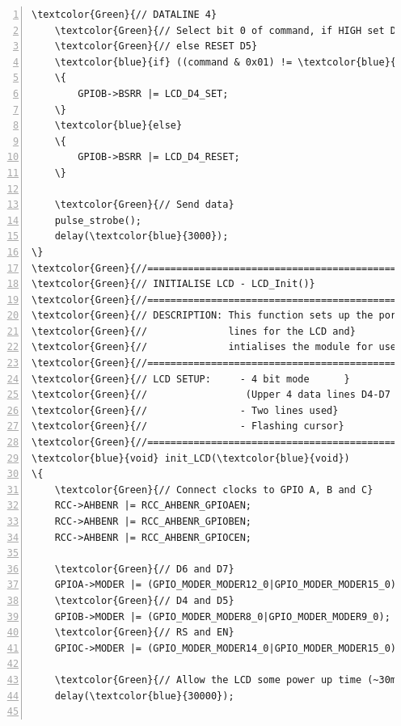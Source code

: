 \begin{Verbatim}[fontfamily=courier,fontsize=\small, numbers=left,commandchars=\\\{\}]
	\textcolor{Green}{// DATALINE 4}
	\textcolor{Green}{// Select bit 0 of command, if HIGH set Data line 5 (D5)}
	\textcolor{Green}{// else RESET D5}
	\textcolor{blue}{if} ((command & 0x01) != \textcolor{blue}{0})		       
	\{
		GPIOB->BSRR |= LCD_D4_SET;
	\}
	\textcolor{blue}{else}
	\{
		GPIOB->BSRR |= LCD_D4_RESET;
	\}
    
	\textcolor{Green}{// Send data}
	pulse_strobe();                          
	delay(\textcolor{blue}{3000});
\}
\textcolor{Green}{//=================================================}
\textcolor{Green}{// INITIALISE LCD - LCD_Init()}
\textcolor{Green}{//=================================================}
\textcolor{Green}{// DESCRIPTION: This function sets up the port }
\textcolor{Green}{//              lines for the LCD and}
\textcolor{Green}{//              intialises the module for use.}
\textcolor{Green}{//=================================================}
\textcolor{Green}{// LCD SETUP:     - 4 bit mode      }
\textcolor{Green}{//                 (Upper 4 data lines D4-D7 used)}
\textcolor{Green}{//                - Two lines used}
\textcolor{Green}{//                - Flashing cursor}
\textcolor{Green}{//=================================================}
\textcolor{blue}{void} init_LCD(\textcolor{blue}{void})
\{
	\textcolor{Green}{// Connect clocks to GPIO A, B and C}
	RCC->AHBENR |= RCC_AHBENR_GPIOAEN; 		  
	RCC->AHBENR |= RCC_AHBENR_GPIOBEN;
	RCC->AHBENR |= RCC_AHBENR_GPIOCEN;

	\textcolor{Green}{// D6 and D7}
	GPIOA->MODER |= (GPIO_MODER_MODER12_0|GPIO_MODER_MODER15_0); 
	\textcolor{Green}{// D4 and D5}
	GPIOB->MODER |= (GPIO_MODER_MODER8_0|GPIO_MODER_MODER9_0);   
	\textcolor{Green}{// RS and EN}
	GPIOC->MODER |= (GPIO_MODER_MODER14_0|GPIO_MODER_MODER15_0); 

	\textcolor{Green}{// Allow the LCD some power up time (~30ms)}
	delay(\textcolor{blue}{30000});							  


\end{Verbatim}
